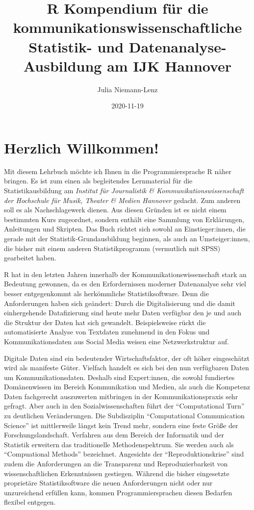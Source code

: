 \documentclass[
]{book}
\title{R Kompendium für die kommunikationswissenschaftliche Statistik- und Datenanalyse-Ausbildung am IJK Hannover}
\author{Julia Niemann-Lenz}
\date{2020-11-19}
\begin{document}
\maketitle

{
\setcounter{tocdepth}{1}
\tableofcontents
}
\hypertarget{herzlich-willkommen}{%
\chapter*{Herzlich Willkommen!}\label{herzlich-willkommen}}

Mit diesem Lehrbuch möchte ich Ihnen in die Programmiersprache R näher bringen. Es ist zum einen als begleitendes Lernmaterial für die Statistikausbildung am \emph{Institut für Journalistik \& Kommunikationswissenschaft der Hochschule für Musik, Theater \& Medien Hannover} gedacht. Zum anderen soll es als Nachschlagewerk dienen. Aus diesen Gründen ist es nicht einem bestimmten Kurs zugeordnet, sondern enthält eine Sammlung von Erklärungen, Anleitungen und Skripten. Das Buch richtet sich sowohl an Einstieger:innen, die gerade mit der Statistik-Grundausbildung beginnen, als auch an Umsteiger:innen, die bisher mit einem anderen Statistikprogramm (vermutlich mit SPSS) gearbeitet haben.

R hat in den letzten Jahren innerhalb der Kommunikationswissenschaft stark an Bedeutung gewonnen, da es den Erfordernissen moderner Datenanalyse sehr viel besser entgegenkommt als herkömmliche Statistiksoftware. Denn die Anforderungen haben sich geändert: Durch die Digitalisierung und die damit einhergehende Datafizierung sind heute mehr Daten verfügbar den je und auch die Struktur der Daten hat sich gewandelt. Beispielsweise rückt die automatisierte Analyse von Textdaten zunehmend in den Fokus und Kommunikationsdaten aus Social Media weisen eine Netzwerkstruktur auf.

Digitale Daten sind ein bedeutender Wirtschaftsfaktor, der oft höher eingeschätzt wird als manifeste Güter. Vielfach handelt es sich bei den nun verfügbaren Daten um Kommunikationsdaten. Deshalb sind Expert:innen, die sowohl fundiertes Domänenwissen im Bereich Kommunikation und Medien, als auch die Kompetenz Daten fachgerecht auszuwerten mitbringen in der Kommunikationspraxis sehr gefragt. Aber auch in den Sozialwissenschaften führt der ``Computational Turn'' zu deutlichen Veränderungen. Die Subdisziplin ``Computational Communication Science'' ist mittlerweile längst kein Trend mehr, sondern eine feste Größe der Forschungslandschaft. Verfahren aus dem Bereich der Informatik und der Statistik erweitern das traditionelle Methodenspektrum. Sie werden auch als ``Compuational Methods'' bezeichnet. Angesichts der ``Reproduktionskrise'' sind zudem die Anforderungen an die Transparenz und Reproduzierbarkeit von wissenschaftlichen Erkenntnissen gestiegen. Während die bisher eingesetzte proprietäre Statistiksoftware die neuen Anforderungen nicht oder nur unzureichend erfüllen kann, kommen Programmiersprachen diesen Bedarfen flexibel entgegen.
\end{document}
